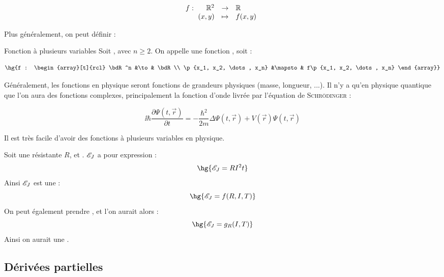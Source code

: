 \documentclass[a4paper,french,bookmarks]{book}
\begin{document}
    \[ f : \begin{array}[t]{rcl}
        \mathbb{R}^2 &\to& \mathbb{R}  \\
        \!\left(x, y\right) &\mapsto& f\!\left(x,y\right) 
        \end{array}
    \]
    
    Plus généralement, on peut définir :
    
    \begin{definition}{Fonction à plusieurs variables}
        Soit , avec $n \geq 2$. On appelle  une fonction , soit :
        
        \[ \hg{f : \begin{array}[t]{rcl}
        \bdR^n &\to& \bdR  \\
        \p{x_1, x_2, \dots, x_n} &\mapsto& f\p{x_1, x_2, \dots, x_n} 
        \end{array}}\]
    
    \end{definition}
    
    Généralement, les fonctions en physique seront fonctions de grandeurs physiques (masse, longueur, ...). Il n'y a qu'en physique quantique que l'on aura des fonctions complexes, principalement la fonction d'onde livrée par l'équation de \textsc{Schrödinger} :
    
    \[ \displaystyle \ii\hbar {\frac {\partial \Psi (t,{\vec {r}})}{\partial t}}=-{\frac {\hbar ^{2}}{2m}}\Delta \Psi (t,{\vec {r}})+V({\vec {r}})\Psi (t,{\vec {r}}) \]
    
    Il est très facile d'avoir des fonctions à plusieurs variables en physique. 
    
    \begin{example}{}{}
        Soit une résistante $R$, et . $\mathscr{E}_J$ a pour expression :
        \[ \hg{\bsE_J = RI^2t} \]
        Ainsi $\mathscr{E}_J$ est une  :
        \[ \hg{\bsE_J = f\p{R, I, T}} \]
        On peut également prendre , et l'on aurait alors :
        \[ \hg{\bsE_J = g_R\p{I, T}} \]
        Ainsi on aurait une .
    \end{example}
    
    \subsection{Dérivées partielles}
    
\end{document}

